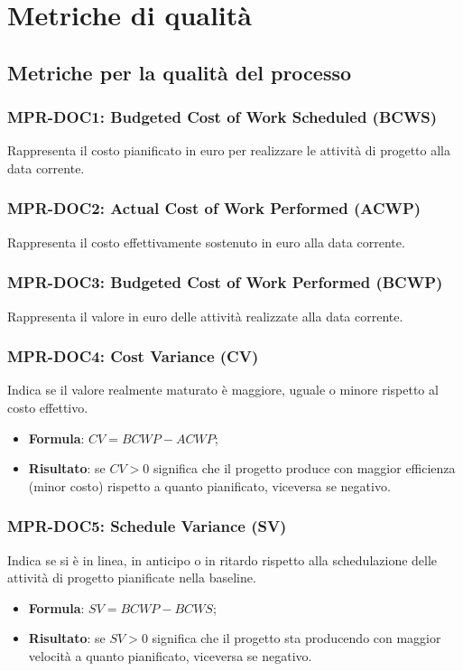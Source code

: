 \appendix
\section{Metriche di qualità}

\subsection{Metriche per la qualità del processo} \label{_metricheprocesso}

\subsubsection{MPR-DOC1: Budgeted Cost of Work Scheduled (BCWS)} \label{_MPR-DOC1}
Rappresenta il costo pianificato in euro per realizzare le attività di progetto alla data corrente.

\subsubsection{MPR-DOC2: Actual Cost of Work Performed (ACWP)} \label{_MPR-DOC2}
Rappresenta il costo effettivamente sostenuto in euro alla data corrente.

\subsubsection{MPR-DOC3: Budgeted Cost of Work Performed (BCWP)} \label{_MPR-DOC3}
Rappresenta il valore in euro delle attività realizzate alla data corrente.

\subsubsection{MPR-DOC4: Cost Variance (CV)} \label{_MPR-DOC4}
Indica se il valore realmente maturato è maggiore, uguale o minore rispetto al costo effettivo.
\begin{itemize}
    \item \textbf{Formula}: $CV = BCWP - ACWP$;
    \item \textbf{Risultato}: se $CV > 0$ significa che il progetto produce con maggior efficienza (minor costo) rispetto a quanto pianificato, viceversa se negativo.
\end{itemize}

\subsubsection{MPR-DOC5: Schedule Variance (SV)} \label{_MPR-DOC5}
Indica se si è in linea, in anticipo o in ritardo rispetto alla schedulazione delle attività di progetto pianificate nella baseline.
\begin{itemize}
    \item \textbf{Formula}: $SV = BCWP - BCWS$;
    \item \textbf{Risultato}: se $SV > 0$ significa che il progetto sta producendo con maggior velocità a quanto pianificato, viceversa se negativo.
\end{itemize}


